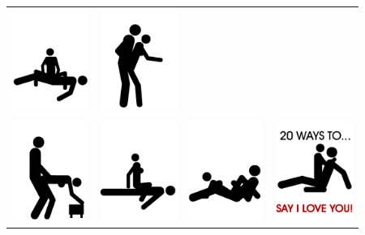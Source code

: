 \begin{tabular}{cccc}
\includegraphics[width=2.5cm]{20waysto/f32.png}&
\includegraphics[width=2.5cm]{20waysto/f33.png}\\
\includegraphics[width=2.5cm]{20waysto/f40.png}&
\includegraphics[width=2.5cm]{20waysto/f41.png}&
\includegraphics[width=2.5cm]{20waysto/f42.png}&
\includegraphics[width=2.5cm]{20waysto/f43.png}\\
\end{tabular}


